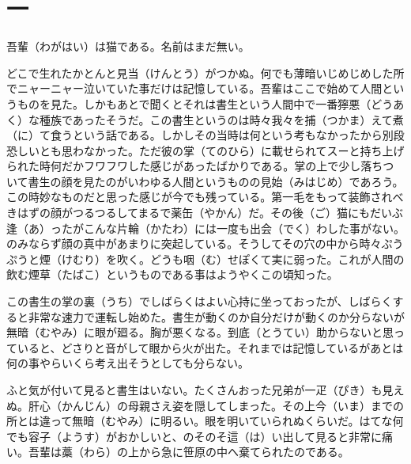 \documentclass{book}
\begin{document}
\chapter*{\centering 一}

吾輩（わがはい）は猫である。名前はまだ無い。

どこで生れたかとんと見当（けんとう）がつかぬ。何でも薄暗いじめじめした所でニャーニャー泣いていた事だけは記憶している。吾輩はここで始めて人間というものを見た。しかもあとで聞くとそれは書生という人間中で一番獰悪（どうあく）な種族であったそうだ。この書生というのは時々我々を捕（つかま）えて煮（に）て食うという話である。しかしその当時は何という考もなかったから別段恐しいとも思わなかった。ただ彼の掌（てのひら）に載せられてスーと持ち上げられた時何だかフワフワした感じがあったばかりである。掌の上で少し落ちついて書生の顔を見たのがいわゆる人間というものの見始（みはじめ）であろう。この時妙なものだと思った感じが今でも残っている。第一毛をもって装飾されべきはずの顔がつるつるしてまるで薬缶（やかん）だ。その後（ご）猫にもだいぶ逢（あ）ったがこんな片輪（かたわ）には一度も出会（でく）わした事がない。のみならず顔の真中があまりに突起している。そうしてその穴の中から時々ぷうぷうと煙（けむり）を吹く。どうも咽（む）せぽくて実に弱った。これが人間の飲む煙草（たばこ）というものである事はようやくこの頃知った。

この書生の掌の裏（うち）でしばらくはよい心持に坐っておったが、しばらくすると非常な速力で運転し始めた。書生が動くのか自分だけが動くのか分らないが無暗（むやみ）に眼が廻る。胸が悪くなる。到底（とうてい）助からないと思っていると、どさりと音がして眼から火が出た。それまでは記憶しているがあとは何の事やらいくら考え出そうとしても分らない。

ふと気が付いて見ると書生はいない。たくさんおった兄弟が一疋（ぴき）も見えぬ。肝心（かんじん）の母親さえ姿を隠してしまった。その上今（いま）までの所とは違って無暗（むやみ）に明るい。眼を明いていられぬくらいだ。はてな何でも容子（ようす）がおかしいと、のそのそ這（は）い出して見ると非常に痛い。吾輩は藁（わら）の上から急に笹原の中へ棄てられたのである。
\end{document}
